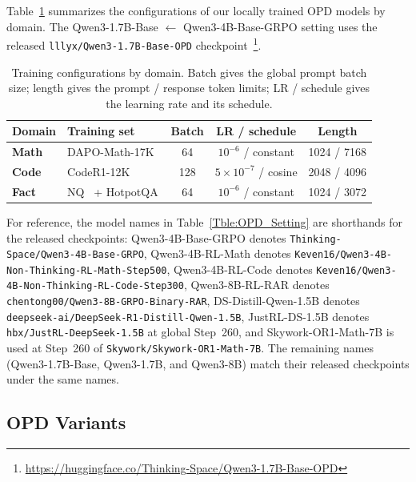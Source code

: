 \documentclass{article}
\theoremstyle{opdplain}
\begin{document}
Table~\ref{tab:main-training-configurations} summarizes the configurations of our locally trained OPD models by domain. The Qwen3-1.7B-Base $\leftarrow$ Qwen3-4B-Base-GRPO setting uses the released \texttt{lllyx/Qwen3-1.7B-Base-OPD} checkpoint~\citep{li2026rethinkingopd}\footnote{\url{https://huggingface.co/Thinking-Space/Qwen3-1.7B-Base-OPD}}.

\begin{table}[!ht]
\centering
\setlength{\tabcolsep}{2pt}
\renewcommand{\arraystretch}{1}
\caption{Training configurations by domain. Batch gives the global prompt batch size; length gives the prompt / response token limits; LR / schedule gives the learning rate and its schedule.}
\label{tab:main-training-configurations}
\vspace{-8.5pt}
\fontsize{6.93}{7.7}\selectfont
\begin{tabular}{@{}l|lccc@{}}
\toprule[1.6pt]
\textbf{Domain} & \textbf{Training set} & \textbf{Batch} & \textbf{LR / schedule} & \textbf{Length} \\
\midrule
\textbf{Math} & DAPO-Math-17K~\citep{yu2025dapo} & 64 & $10^{-6}$ / constant & 1024 / 7168 \\
\textbf{Code} & CodeR1-12K~\citep{ganler2025coder1} & 128 & $5{\times}10^{-7}$ / cosine & 2048 / 4096 \\
\textbf{Fact} & NQ~\citep{kwiatkowski2019naturalquestions} + HotpotQA & 64 & $10^{-6}$ / constant & 1024 / 3072 \\
\bottomrule[1.6pt]
\end{tabular}
\end{table}

For reference, the model names in Table~\ref{Tble:OPD_Setting} are shorthands for the released checkpoints: Qwen3-4B-Base-GRPO denotes \texttt{Thinking-Space/Qwen3-4B-Base-GRPO}, Qwen3-4B-RL-Math denotes \texttt{Keven16/Qwen3-4B-Non-Thinking-RL-Math-Step500}, Qwen3-4B-RL-Code denotes \texttt{Keven16/Qwen3-4B-Non-Thinking-RL-Code-Step300}, Qwen3-8B-RL-RAR denotes \texttt{chentong00/Qwen3-8B-GRPO-Binary-RAR}, DS-Distill-Qwen-1.5B denotes \texttt{deepseek-ai/DeepSeek-R1-Distill-Qwen-1.5B}, JustRL-DS-1.5B denotes \texttt{hbx/JustRL-DeepSeek-1.5B} at global Step~260, and Skywork-OR1-Math-7B is used at Step~260 of \texttt{Skywork/Skywork-OR1-Math-7B}. The remaining names (Qwen3-1.7B-Base, Qwen3-1.7B, and Qwen3-8B) match their released checkpoints under the same names.

\subsection{OPD Variants}
\end{document}
